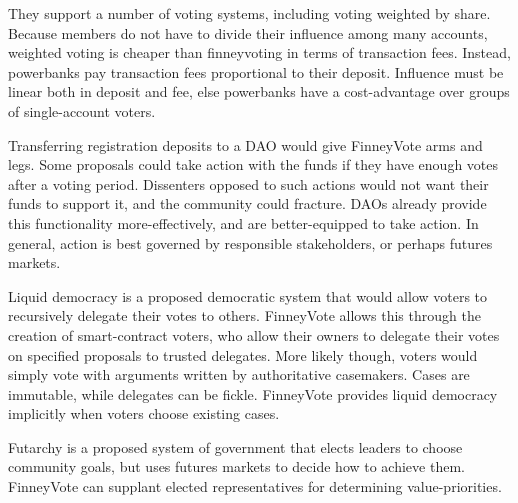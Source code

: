 \documentclass{article}
\begin{document}
They support a number of voting systems, including voting weighted by share.
Because members do not have to divide their influence among many accounts, weighted voting is cheaper than finneyvoting in terms of transaction fees.
Instead, powerbanks pay transaction fees proportional to their deposit.
Influence must be linear both in deposit and fee, else powerbanks have a cost-advantage over groups of single-account voters.
\par
Transferring registration deposits to a DAO would give FinneyVote arms and legs.
Some proposals could take action with the funds if they have enough votes after a voting period.
Dissenters opposed to such actions would not want their funds to support it, and the community could fracture.
DAOs already provide this functionality more-effectively, and are better-equipped to take action.
In general, action is best governed by responsible stakeholders, or perhaps futures markets.
\par
Liquid democracy is a proposed democratic system that would allow voters to recursively delegate their votes to others.
FinneyVote allows this through the creation of smart-contract voters, who allow their owners to delegate their votes on specified proposals to trusted delegates.
More likely though, voters would simply vote with arguments written by authoritative casemakers.
Cases are immutable, while delegates can be fickle.
FinneyVote provides liquid democracy implicitly when voters choose existing cases.
\par
Futarchy is a proposed system of government that elects leaders to choose community goals, but uses futures markets to decide how to achieve them.
FinneyVote can supplant elected representatives for determining value-priorities.
\end{document}
